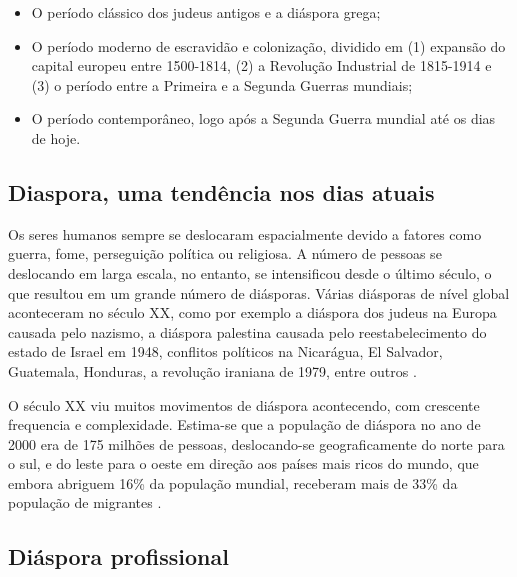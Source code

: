 \documentclass[
	12pt,				%
	openright,			%
	twoside,			%
	a4paper,			%
	english,			%
	french,				%
	spanish,			%
	brazil				%
	]{abntex2}
\begin{document}
\begin{itemize}
	\item O período clássico dos judeus antigos e a diáspora grega;
	\item O período moderno de escravidão e colonização, dividido em (1) expansão do capital europeu entre 1500-1814, (2) a Revolução Industrial de 1815-1914 e (3) o período entre a Primeira e a Segunda Guerras mundiais;
	\item O período contemporâneo, logo após a Segunda Guerra mundial até os dias de hoje.
  \end{itemize}\cite[41-60]{reis_theorizing_2004}

\subsection{Diaspora, uma tendência nos dias atuais}

Os seres humanos sempre se deslocaram espacialmente devido a fatores como guerra, fome, perseguição política ou religiosa. A número de pessoas se deslocando em larga escala, no entanto, se intensificou desde o último século, o que resultou em um grande número de diásporas. Várias diásporas de nível global aconteceram no século XX, como por exemplo a diáspora dos judeus na Europa causada pelo nazismo, a diáspora palestina causada pelo reestabelecimento do estado de Israel em 1948, conflitos políticos na Nicarágua, El Salvador, Guatemala, Honduras, a revolução iraniana de 1979, entre outros \cite[25]{wan}.

O século XX viu muitos movimentos de diáspora acontecendo, com crescente frequencia e complexidade. Estima-se que a população de diáspora no ano de 2000 era de 175 milhões de pessoas, deslocando-se geograficamente do norte para o sul, e do leste para o oeste em direção aos países mais ricos do mundo, que embora abriguem 16\% da população mundial, receberam mais de 33\% da população de migrantes \cite[26]{wan}.

\subsection{Diáspora profissional}
\end{document}
